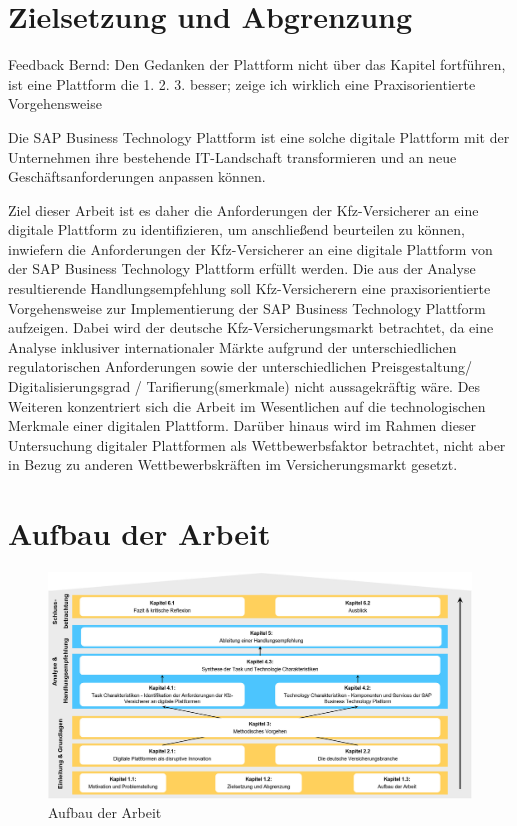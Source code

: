 \section{Zielsetzung und Abgrenzung}

Feedback Bernd: Den Gedanken der Plattform nicht über das Kapitel fortführen, ist eine Plattform die 1. 2. 3. besser; zeige ich wirklich eine Praxisorientierte Vorgehensweise

Die SAP Business Technology Plattform ist eine solche digitale Plattform mit der Unternehmen ihre bestehende IT-Landschaft transformieren und an neue Geschäftsanforderungen anpassen können. 

Ziel dieser Arbeit ist es daher die Anforderungen der Kfz-Versicherer an eine digitale Plattform zu identifizieren, um anschließend beurteilen zu können, inwiefern die Anforderungen der Kfz-Versicherer an eine digitale Plattform von der SAP Business Technology Plattform erfüllt werden. Die aus der Analyse resultierende Handlungsempfehlung soll Kfz-Versicherern eine praxisorientierte Vorgehensweise zur Implementierung der SAP Business Technology Plattform aufzeigen.
Dabei wird der deutsche Kfz-Versicherungsmarkt betrachtet, da eine Analyse inklusiver internationaler Märkte aufgrund der unterschiedlichen regulatorischen Anforderungen sowie der unterschiedlichen Preisgestaltung/ Digitalisierungsgrad / Tarifierung(smerkmale)  nicht aussagekräftig wäre. Des Weiteren konzentriert sich die Arbeit im Wesentlichen auf die technologischen Merkmale einer digitalen Plattform. Darüber hinaus wird im Rahmen dieser Untersuchung digitaler Plattformen als Wettbewerbsfaktor betrachtet, nicht aber in Bezug zu anderen Wettbewerbskräften im Versicherungsmarkt gesetzt.

\newpage
\section{Aufbau der Arbeit}

\begin{figure}[h]
    \centering
    \includegraphics[width=1\textwidth]{img/Aufbau_der_Arbeit.jpg}
    \caption[Aufbau der Arbeit]{Aufbau der Arbeit\autocite{Aufbau}}
    \label{fig:Aufbau}
\end{figure}

